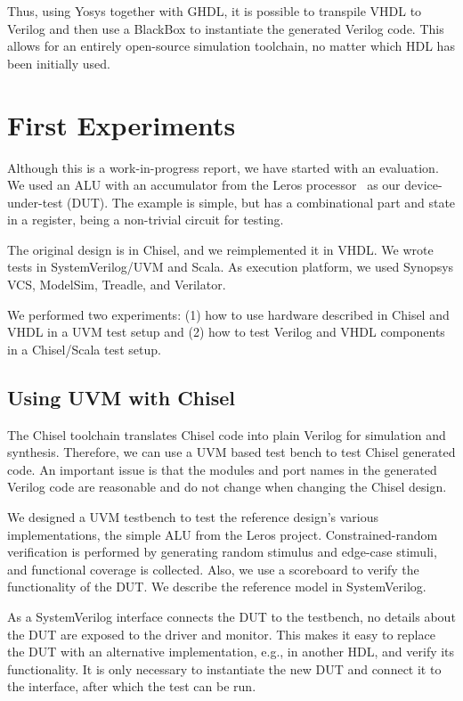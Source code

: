 \documentclass[conference]{IEEEtran}
\newcommand{\martin}[1]{{\color{blue} Martin: #1}}
\renewcommand{\martin}[1]{}
\begin{document}
Thus, using Yosys together with GHDL, it is possible to transpile VHDL to Verilog and then use a BlackBox to instantiate the generated Verilog code. This allows for an entirely open-source simulation toolchain, no matter which HDL has been initially used.



\section{First Experiments}
\label{sec:eval}


Although this is a work-in-progress report, we have started with an evaluation.
We used an ALU with an accumulator from the Leros processor~\cite{leros:arcs2019}
as our device-under-test (DUT).
The example is simple, but has a combinational part and state in a register, being
a non-trivial circuit for testing.

The original design is in Chisel, and we reimplemented it in VHDL.
We wrote tests in SystemVerilog/UVM and Scala.
As execution platform, we used Synopsys VCS, ModelSim, Treadle, and Verilator.

We performed two experiments: (1) how to use hardware described in Chisel and VHDL in a
UVM test setup and (2) how to test Verilog and VHDL components in a Chisel/Scala
test setup.

\martin{We should have implementations in all languages we consider.}


\subsection{Using UVM with Chisel}

The Chisel toolchain translates Chisel code into plain Verilog for simulation and synthesis. Therefore, we can use a UVM based test bench to test Chisel generated code.
An important issue is that the modules and port names in the generated Verilog code are reasonable and do not change when changing the Chisel design.

We designed a UVM testbench to test the reference design's various implementations, the simple ALU from the Leros project.
Constrained-random verification is performed by generating random stimulus and edge-case stimuli, and functional coverage is collected. Also, we use a scoreboard to verify the functionality of the DUT. We describe the reference model in SystemVerilog.

As a SystemVerilog interface connects the DUT to the testbench, no details about the DUT are exposed to the driver and monitor. This makes it easy to replace the DUT with an alternative implementation, e.g., in another HDL, and verify its functionality. It is only necessary to instantiate the new DUT and connect it to the interface, after which the test can be run.
\end{document}
